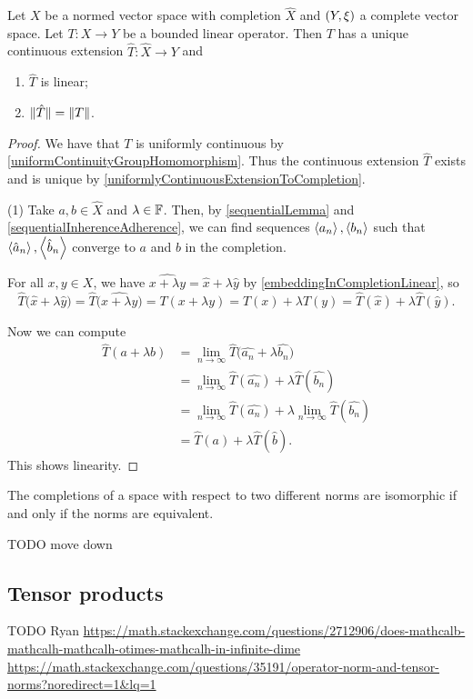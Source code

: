 \begin{proposition}
Let $X$ be a normed vector space with completion $\hat{X}$ and $\sSet{Y, \xi}$ a complete vector space. Let $T: X\to Y$ be a bounded linear operator. Then $T$ has a unique continuous extension $\hat{T}: \hat{X} \to Y$ and
\begin{enumerate}
\item $\hat{T}$ is linear;
\item $\lVert\hat{T}\rVert = \lVert T\rVert$.
\end{enumerate}
\end{proposition}
\begin{proof}
We have that $T$ is uniformly continuous by \ref{uniformContinuityGroupHomomorphism}. Thus the continuous extension $\hat{T}$ exists and is unique by \ref{uniformlyContinuousExtensionToCompletion}.

(1) Take $a,b\in \hat{X}$ and $\lambda \in \mathbb{F}$. Then, by \ref{sequentialLemma} and \ref{sequentialInherenceAdherence}, we can find sequences $\left\langle a_n \right\rangle, \left\langle b_n \right\rangle$ such that $\left\langle \hat{a}_n \right\rangle, \left\langle \hat{b}_n \right\rangle$ converge to $a$ and $b$ in the completion.

For all $x,y\in X$, we have $\widehat{x+\lambda y} = \hat{x} + \lambda \hat{y}$ by \ref{embeddingInCompletionLinear}, so
\[ \hat{T}\big(\hat{x} + \lambda \hat{y}\big) = \hat{T}\big(\widehat{x+\lambda y}\big) = T(x+\lambda y) = T(x) + \lambda T(y) = \hat{T}(\hat{x}) + \lambda \hat{T}(\hat{y}). \]

Now we can compute
\begin{align*}
\hat{T}(a+ \lambda b) &= \lim_{n\to \infty}\hat{T}\big(\hat{a_n} + \lambda \hat{b_n}\big) \\
&= \lim_{n\to \infty}\hat{T}(\hat{a_n}) + \lambda \hat{T}(\hat{b_n}) \\
&= \lim_{n\to \infty}\hat{T}(\hat{a_n}) + \lambda \lim_{n\to \infty}\hat{T}(\hat{b_n}) \\
&= \hat{T}(a) + \lambda \hat{T}(\hat{b}).
\end{align*}
This shows linearity.
\end{proof}


\begin{proposition}
The completions of a space with respect to two different norms are isomorphic \textup{if and only if} the norms are equivalent.
\end{proposition}

TODO move down
\subsection{Tensor products}
TODO Ryan
\url{https://math.stackexchange.com/questions/2712906/does-mathcalb-mathcalh-mathcalh-otimes-mathcalh-in-infinite-dime}
\url{https://math.stackexchange.com/questions/35191/operator-norm-and-tensor-norms?noredirect=1&lq=1}

